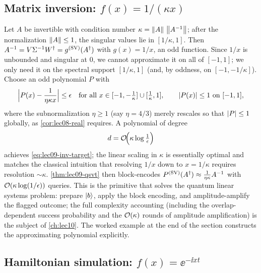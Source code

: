 \subsection*{Matrix inversion: \texorpdfstring{$f(x)=1/(\kappa x)$}{f(x)=1/(kappa x)}}

Let $A$ be invertible with condition number $\kappa=\left\lVert A \right\rVert\,\left\lVert A^{-1} \right\rVert$; after the
normalization $\left\lVert A \right\rVert\le1$, the singular values lie in $[1/\kappa,1]$. Then
$A^{-1}=V\Sigma^{-1}W^{\dagger}=g^{(\mathrm{SV})}(A^{\dagger})$ with $g(x)=1/x$, an odd function.
Since $1/x$ is unbounded and singular at $0$, we cannot approximate it on all of
$[-1,1]$; we only need it on the spectral support $[1/\kappa,1]$ (and, by oddness, on
$[-1,-1/\kappa]$). Choose an odd polynomial $P$ with
\begin{equation}
  \Bigl|P(x)-\frac{1}{\eta\kappa x}\Bigr|\le\epsilon
  \quad\text{for all } x\in[-1,-\tfrac1\kappa]\cup[\tfrac1\kappa,1],
  \qquad \left\lvert P(x) \right\rvert\le1 \text{ on } [-1,1],
  \label{eq:lec09-inv-target}
\end{equation}
where the subnormalization $\eta\ge1$ (say $\eta=4/3$) merely rescales so that
$\left\lvert P \right\rvert\le1$ globally, as \cref{cor:lec08-real} requires. A polynomial of degree
\begin{equation}
  d=\mathcal{O}\!\Bigl(\kappa\log\tfrac1\epsilon\Bigr)
  \label{eq:lec09-inv-degree}
\end{equation}
achieves \eqref{eq:lec09-inv-target}; the linear scaling in $\kappa$ is essentially
optimal and matches the classical intuition that resolving $1/x$ down to $x=1/\kappa$
requires resolution $\sim\kappa$. \cref{thm:lec09-qsvt} then block-encodes
$P^{(\mathrm{SV})}(A^{\dagger})\approx\tfrac1{\eta\kappa}A^{-1}$ with $\mathcal{O}(\kappa\log
(1/\epsilon))$ queries. This is the primitive that solves the quantum linear systems
problem: prepare $\ket b$, apply the block encoding, and amplitude-amplify the flagged
outcome; the full complexity accounting (including the overlap-dependent success
probability and the $\mathcal{O}(\kappa)$ rounds of amplitude amplification) is the subject
of \cref{ch:lec10}. The worked example at the end of the section constructs the
approximating polynomial explicitly.

\subsection*{Hamiltonian simulation: \texorpdfstring{$f(x)=\ee^{-\ii x t}$}{f(x)=exp(-ixt)}}

